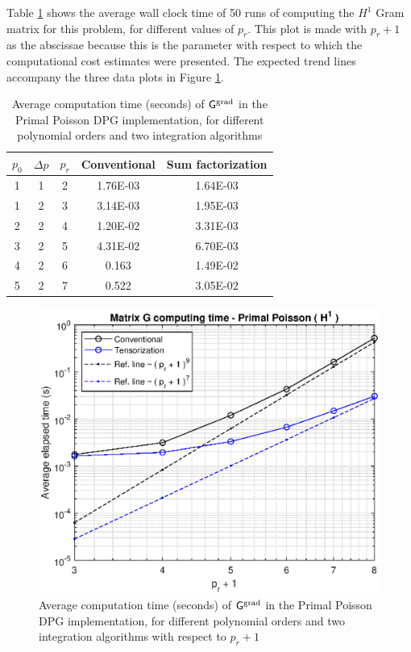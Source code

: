 Table \ref{tab:results_poisson1} shows the average wall clock time of 50 runs of computing the $H^1$ Gram matrix for this problem, for different values of $p_r$. This plot is made with $p_r+1$ as the abscissae because this is the parameter with respect to which the computational cost estimates were presented. The expected trend lines accompany the three data plots in Figure \ref{tab:results_poisson1}.
%
\begin{table}[ht]
    \centering
    \begin{tabular}{|c|c|c|c|c|}
    \hline
    $p_0$ & $\Delta p$ & $p_r$ & \textbf{Conventional} & \textbf{Sum factorization} \\
    \hline
    1	&	1	&	2	&	1.76E-03	&	1.64E-03	\\
    1	&	2	&	3	&	3.14E-03	&	1.95E-03	\\
    2	&	2	&	4	&	1.20E-02	&	3.31E-03	\\
    3	&	2	&	5	&	4.31E-02	&	6.70E-03	\\
    4	&	2	&	6	&	0.163	&	1.49E-02	\\
    5	&	2	&	7	&	0.522	&	3.05E-02	\\
    \hline
    \end{tabular}
    \caption{Average computation time (seconds) of $\mathsf{G}^{\operatorname{grad}}$ in the Primal Poisson DPG implementation, for different polynomial orders and two integration algorithms}
    \label{tab:results_poisson1}
\end{table}
%
\begin{figure}[ht]
    \centering
    \includegraphics[width=12cm]{poisson_G.eps}
    \caption{Average computation time (seconds) of $\mathsf{G}^{\operatorname{grad}}$ in the Primal Poisson DPG implementation, for different polynomial orders and two integration algorithms with respect to $p_r+1$}
    \label{fig:results_poisson1}
\end{figure}

